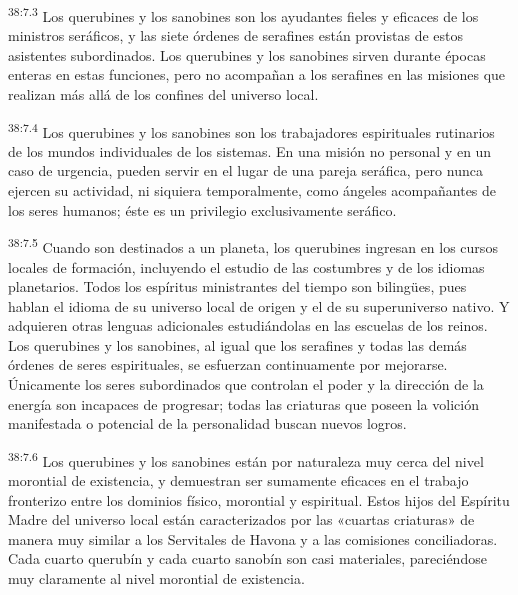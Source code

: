 \par
\textsuperscript{38:7.3} Los querubines y los sanobines son los ayudantes fieles y eficaces de los ministros seráficos, y las siete órdenes de serafines están provistas de estos asistentes subordinados. Los querubines y los sanobines sirven durante épocas enteras en estas funciones, pero no acompañan a los serafines en las misiones que realizan más allá de los confines del universo local.

\par
\textsuperscript{38:7.4} Los querubines y los sanobines son los trabajadores espirituales rutinarios de los mundos individuales de los sistemas. En una misión no personal y en un caso de urgencia, pueden servir en el lugar de una pareja seráfica, pero nunca ejercen su actividad, ni siquiera temporalmente, como ángeles acompañantes de los seres humanos; éste es un privilegio exclusivamente seráfico.

\par
\textsuperscript{38:7.5} Cuando son destinados a un planeta, los querubines ingresan en los cursos locales de formación, incluyendo el estudio de las costumbres y de los idiomas planetarios. Todos los espíritus ministrantes del tiempo son biling\"ues, pues hablan el idioma de su universo local de origen y el de su superuniverso nativo. Y adquieren otras lenguas adicionales estudiándolas en las escuelas de los reinos. Los querubines y los sanobines, al igual que los serafines y todas las demás órdenes de seres espirituales, se esfuerzan continuamente por mejorarse. Únicamente los seres subordinados que controlan el poder y la dirección de la energía son incapaces de progresar; todas las criaturas que poseen la volición manifestada o potencial de la personalidad buscan nuevos logros.

\par
\textsuperscript{38:7.6} Los querubines y los sanobines están por naturaleza muy cerca del nivel morontial de existencia, y demuestran ser sumamente eficaces en el trabajo fronterizo entre los dominios físico, morontial y espiritual. Estos hijos del Espíritu Madre del universo local están caracterizados por las «cuartas criaturas» de manera muy similar a los Servitales de Havona y a las comisiones conciliadoras. Cada cuarto querubín y cada cuarto sanobín son casi materiales, pareciéndose muy claramente al nivel morontial de existencia.

